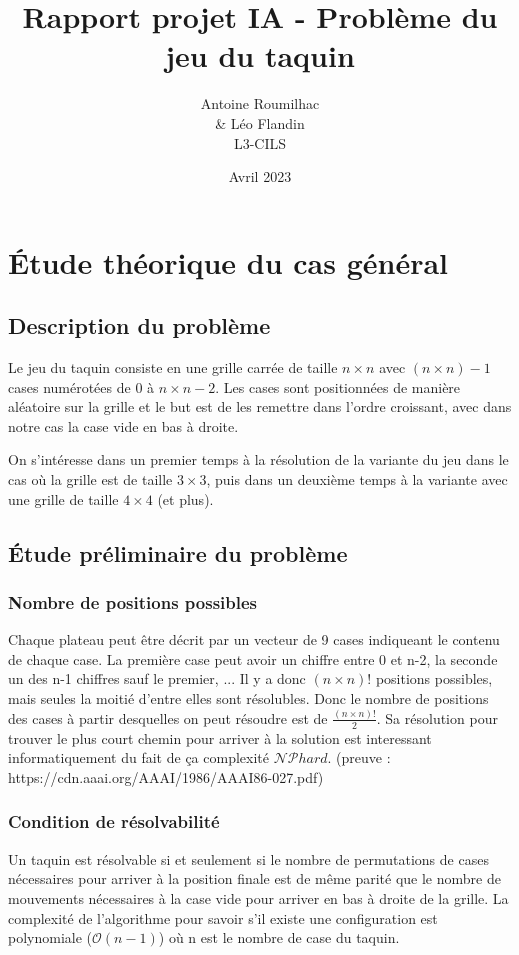 \documentclass[a4paper, 12pt]{article}
\title{Rapport projet IA - Problème du jeu du taquin}
\author{Antoine Roumilhac\\
    \& Léo Flandin\\
    L3-CILS}
\date{Avril 2023}
\begin{document}
\maketitle

\section{Étude théorique du cas général}

\subsection{Description du problème}
Le jeu du taquin consiste en une grille carrée de taille $n\times n$ avec $(n\times n) - 1$ cases numérotées de 0 à $n \times n - 2$.
Les cases sont positionnées de manière aléatoire sur la grille et le but est de les remettre dans l'ordre croissant, avec dans notre cas la case vide en bas à droite.


On s'intéresse dans un premier temps à la résolution de la variante du jeu dans le cas où la grille est de taille $3 \times 3$, puis dans un deuxième temps à la variante avec une grille de taille $4 \times 4$ (et plus).

\subsection{Étude préliminaire du problème}

\subsubsection{Nombre de positions possibles}
Chaque plateau peut être décrit par un vecteur de 9 cases indiqueant le contenu de chaque case. La première case peut avoir un chiffre entre 0 et n-2, la seconde un des n-1 chiffres sauf le premier, ...
Il y a donc $(n \times n)!$ positions possibles, mais seules la moitié d'entre elles sont résolubles.
Donc le nombre de positions des cases à partir desquelles on peut résoudre est de $\frac{(n\times n)!}{2}$.
Sa résolution pour trouver le plus court chemin pour arriver à la solution est interessant informatiquement du fait de ça complexité $\mathcal{NP}hard$. (preuve : https://cdn.aaai.org/AAAI/1986/AAAI86-027.pdf)
\subsubsection{Condition de résolvabilité}
Un taquin est résolvable si et seulement si le nombre de permutations de cases nécessaires pour arriver à la position finale est de même parité que le nombre de mouvements nécessaires à la case vide pour arriver en bas à droite de la grille.
La complexité de l'algorithme pour savoir s'il existe une configuration est polynomiale ($\mathcal{O}(n-1)$) où n est le nombre de case du taquin.
\end{document}
